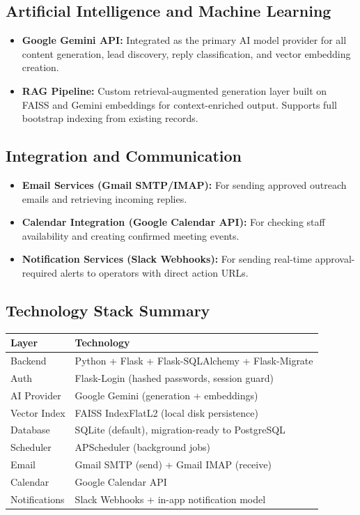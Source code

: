 \documentclass[12pt,a4paper]{report}
\begin{document}
\subsection{Artificial Intelligence and Machine Learning}
\begin{itemize}
    \item \textbf{Google Gemini API:} Integrated as the primary AI model provider for all content generation, lead discovery, reply classification, and vector embedding creation.
    \item \textbf{RAG Pipeline:} Custom retrieval-augmented generation layer built on FAISS and Gemini embeddings for context-enriched output. Supports full bootstrap indexing from existing records.
\end{itemize}

\subsection{Integration and Communication}
\begin{itemize}
    \item \textbf{Email Services (Gmail SMTP/IMAP):} For sending approved outreach emails and retrieving incoming replies.
    \item \textbf{Calendar Integration (Google Calendar API):} For checking staff availability and creating confirmed meeting events.
    \item \textbf{Notification Services (Slack Webhooks):} For sending real-time approval-required alerts to operators with direct action URLs.
\end{itemize}

\subsection{Technology Stack Summary}
\begin{center}
\begin{tabularx}{\textwidth}{>{\raggedright\arraybackslash}p{} X}
\toprule
\textbf{Layer} & \textbf{Technology} \\
\midrule
Backend & Python + Flask + Flask-SQLAlchemy + Flask-Migrate \\
Auth & Flask-Login (hashed passwords, session guard) \\
AI Provider & Google Gemini (generation + embeddings) \\
Vector Index & FAISS IndexFlatL2 (local disk persistence) \\
Database & SQLite (default), migration-ready to PostgreSQL \\
Scheduler & APScheduler (background jobs) \\
Email & Gmail SMTP (send) + Gmail IMAP (receive) \\
Calendar & Google Calendar API \\
Notifications & Slack Webhooks + in-app notification model \\
\bottomrule
\end{tabularx}
\end{center}
\end{document}
